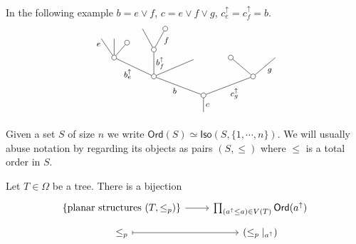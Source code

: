 \documentclass[a4paper,10pt]{article}%
\begin{document}
\begin{example} In the following example $b = e \vee f$, $c = e \vee f \vee g$, $c^{\uparrow}_e= c^{\uparrow}_f =b$.
  \[
  \begin{tikzpicture}[grow=up,auto,level distance=1.9em,
    every node/.style = {font=\footnotesize,inner sep=2pt},
    dummy/.style={circle,draw,inner sep=0pt,minimum size=1.75mm}]
    \node at (0,0) {}
    child{node [dummy] {}
      child[sibling distance = 10em]{node [dummy] {}
        child[sibling distance = 4.5em]{
          edge from parent node [swap] {$g$}}
        child[sibling distance = 4.5em]{node [dummy] {}}
        edge from parent node [swap] {$c_g^{\uparrow}$}}
      child[sibling distance = 10em]{node [dummy] {}
        child[sibling distance = 4em,level distance=1.7em]
        child[sibling distance = 1.5em,level distance=2.7em]{node [dummy] {}
          child[level distance=2.1em,sibling distance = 2.3em]{node [dummy] {}
            edge from parent node [near end,swap] {$f$}}		
          child[level distance=2.1em,sibling distance = 2.3em]{
            edge from parent node [near end] {}}
          edge from parent node [swap] {$b^{\uparrow}_{f}$}}
        child[sibling distance = 4em]{node [dummy] {}
          child[sibling distance =1.3em, level distance = 1.5 em]{node [dummy]  {}
            edge from parent node [swap] {}}
          child[sibling distance = 1.3em]{
            edge from parent node [very near end,swap] {}}
          child[sibling distance =1.3em]{
            edge from parent node [very near end] {$e$}}
          edge from parent node {$b^{\uparrow}_e$}}
        edge from parent node {$b$}}
      edge from parent node [swap] {$c$}};
  \end{tikzpicture}
  \]
\end{example}

\begin{notation}
  Given a set $S$ of size $n$ we write
  $\textsf{Ord}(S) \simeq \mathsf{Iso}(S,\{1,\cdots,n\})$. We will usually abuse notation by regarding its objects as pairs $(S,\leq)$ where $\leq$ is a total order in $S$.
\end{notation}


\begin{proposition}\label{PLANARIZATIONCHAR PROP}
  Let $T \in \Omega$ be a tree. There is a bijection
  \begin{equation}\label{PLANAR EQ}
    \begin{tikzcd}[row sep = 0.5em]
      \{\text{planar structures }(T,\leq_p)\} \ar[r] &
      \prod_{(a^{\uparrow} \leq a) \in V(T)} \mathsf{Ord}(a^{\uparrow}) \\
      \leq_p \ar[mapsto]{r} & (\leq_p|_{a^{\uparrow}})
    \end{tikzcd}	
  \end{equation}
\end{proposition}
\end{document}
